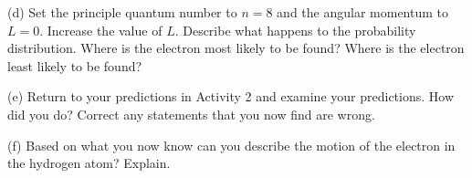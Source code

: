\newpage

(d) Set the principle quantum number to $n=8$ and the angular momentum to $L=0$.
Increase the value of $L$.
Describe what happens to the probability distribution.
Where is the electron most likely to be found?
Where is the electron least likely to be found?
\vspace{3.0cm}

(e) Return to your predictions in Activity 2 and examine your predictions.
How did you do?
Correct any statements that you now find are wrong.
\vspace{2.0cm}

(f) Based on what you now know can you describe the motion of the electron
in the hydrogen atom? Explain.

\vspace{3.0cm}
